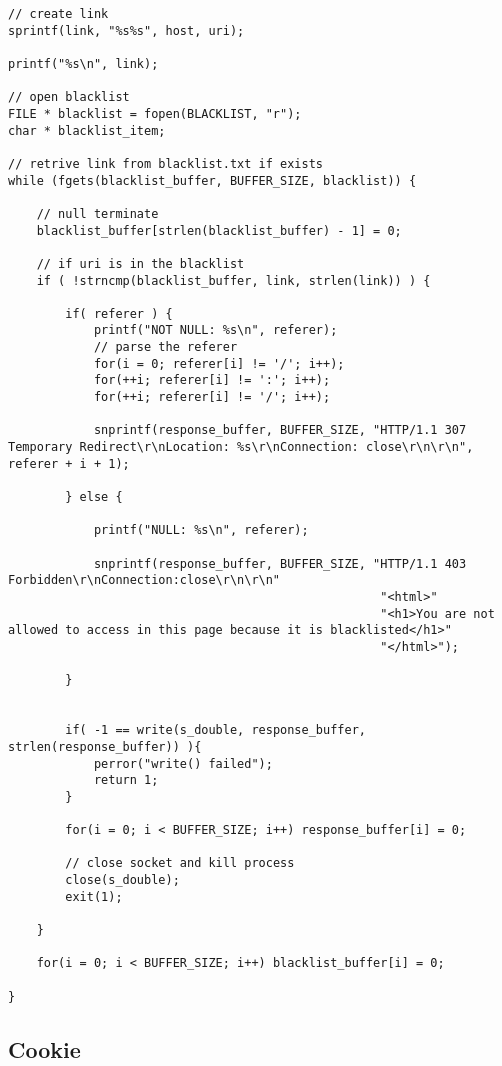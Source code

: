 \begin{lstlisting}
// create link
sprintf(link, "%s%s", host, uri);

printf("%s\n", link);

// open blacklist
FILE * blacklist = fopen(BLACKLIST, "r");
char * blacklist_item;

// retrive link from blacklist.txt if exists
while (fgets(blacklist_buffer, BUFFER_SIZE, blacklist)) {

    // null terminate
    blacklist_buffer[strlen(blacklist_buffer) - 1] = 0;

    // if uri is in the blacklist
    if ( !strncmp(blacklist_buffer, link, strlen(link)) ) {

        if( referer ) {
            printf("NOT NULL: %s\n", referer);
            // parse the referer
            for(i = 0; referer[i] != '/'; i++);
            for(++i; referer[i] != ':'; i++);
            for(++i; referer[i] != '/'; i++);

            snprintf(response_buffer, BUFFER_SIZE, "HTTP/1.1 307 Temporary Redirect\r\nLocation: %s\r\nConnection: close\r\n\r\n", referer + i + 1);

        } else {
            
            printf("NULL: %s\n", referer);

            snprintf(response_buffer, BUFFER_SIZE, "HTTP/1.1 403 Forbidden\r\nConnection:close\r\n\r\n"
                                                    "<html>"
                                                    "<h1>You are not allowed to access in this page because it is blacklisted</h1>"
                                                    "</html>");

        }


        if( -1 == write(s_double, response_buffer, strlen(response_buffer)) ){
            perror("write() failed");
            return 1;
        }

        for(i = 0; i < BUFFER_SIZE; i++) response_buffer[i] = 0;

        // close socket and kill process
        close(s_double);
        exit(1);

    }

    for(i = 0; i < BUFFER_SIZE; i++) blacklist_buffer[i] = 0;

}
\end{lstlisting}


\newpage\subsection{Cookie}

